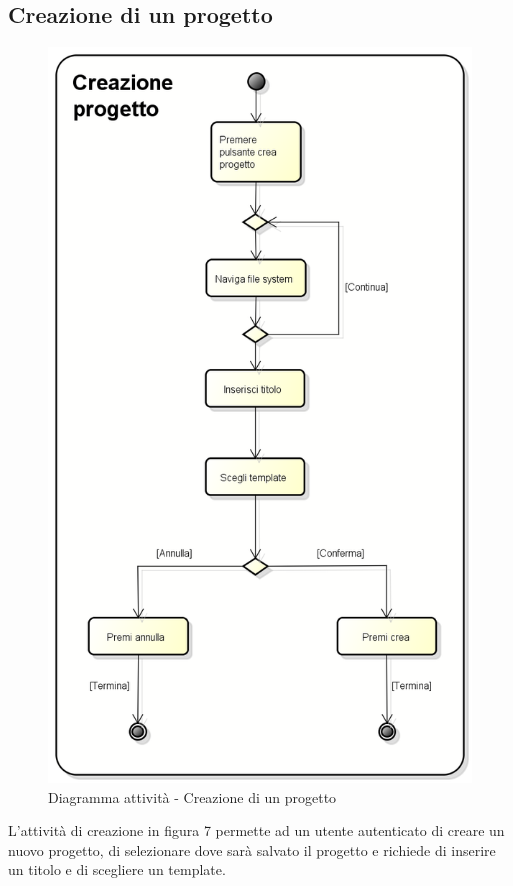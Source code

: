 \subsection{Creazione di un progetto}
\begin{figure}[h] 
	\centering 
	\includegraphics[scale=0.3] {img/Activity_creazione.png} 
	\caption{Diagramma attività - Creazione di un progetto} 
\end{figure}
L'attività di creazione in figura 7 permette ad un utente autenticato di creare un nuovo progetto, di selezionare dove sarà salvato il progetto e richiede di inserire un titolo e di scegliere un template.
\newpage


